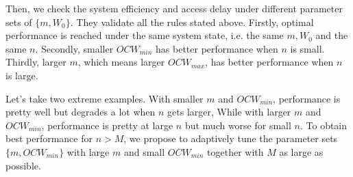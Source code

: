 Then, we check the system efficiency and access delay under different parameter sets of $\lbrace m, W_0 \rbrace$. They validate all the rules stated above. 
Firstly, optimal performance is reached under the same system state, i.e. the same $m,W_0$ and the same $n$.
Secondly, smaller $OCW_{min}$ has better performance when $n$ is small.
Thirdly, larger $m$, which means larger $OCW_{max}$, has better performance when $n$ is large. 

Let's take two extreme examples. With smaller $m$ and $OCW_{min}$, performance is pretty well but degrades a lot when $n$ gets larger,
While with larger $m$ and $OCW_{min}$, performance is pretty at large $n$ but much worse for small $n$.
To obtain best performance for $n>M$, we propose to adaptively tune the parameter sets $\lbrace m, OCW_{min}\rbrace$ with large $m$ and small $OCW_{min}$ together with $M$ as large as possible. 


